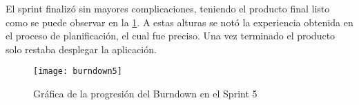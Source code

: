 \begin{table}[H]
\label{TRA-59}
\end{table}

El sprint finalizó sin mayores complicaciones, teniendo el producto final listo como se puede observar en la \ref{fig:burndown5}. A estas alturas se notó la experiencia obtenida en el proceso de planificación, el cual fue preciso. Una vez terminado el producto solo restaba desplegar la aplicación.

\begin{figure}[h]
    \centering
    \texttt{[image: burndown5]}
    \caption[Burndown Sprint 5]{Gráfica de la progresión del Burndown en el Sprint 5}
	\label{fig:burndown5}
\end{figure}
